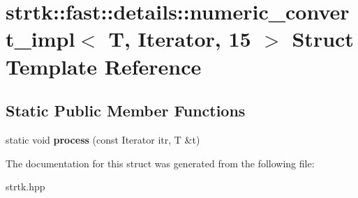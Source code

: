 \hypertarget{structstrtk_1_1fast_1_1details_1_1numeric__convert__impl_3_01T_00_01Iterator_00_0115_01_4}{\section{strtk\-:\-:fast\-:\-:details\-:\-:numeric\-\_\-convert\-\_\-impl$<$ T, Iterator, 15 $>$ Struct Template Reference}
\label{structstrtk_1_1fast_1_1details_1_1numeric__convert__impl_3_01T_00_01Iterator_00_0115_01_4}
}
\subsection*{Static Public Member Functions}
\begin{DoxyCompactItemize}
\item 
\hypertarget{structstrtk_1_1fast_1_1details_1_1numeric__convert__impl_3_01T_00_01Iterator_00_0115_01_4_a598fe75a51c6a8b40156109fdfba65a4}{static void {\bfseries process} (const Iterator itr, T \&t)}\label{structstrtk_1_1fast_1_1details_1_1numeric__convert__impl_3_01T_00_01Iterator_00_0115_01_4_a598fe75a51c6a8b40156109fdfba65a4}

\end{DoxyCompactItemize}


The documentation for this struct was generated from the following file\-:\begin{DoxyCompactItemize}
\item 
strtk.\-hpp\end{DoxyCompactItemize}
